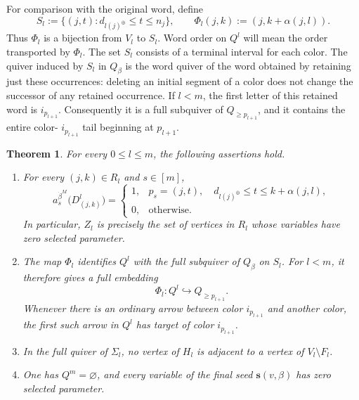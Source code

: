 \documentclass[12pt, reqno]{amsart}
\theoremstyle{plain}
\newtheorem{theorem}{Theorem}[section]
\theoremstyle{definition}
\numberwithin{equation}{section}
\begin{document}
For comparison with the original word, define
\begin{equation}\label{eq:support-image}
 S_l:=\{(j,t):d_{l(j)^\oplus}\leq t\leq n_j\},
 \qquad
 \Phi_l(j,k):=(j,k+\alpha(j,l)).
\end{equation}
Thus \(\Phi_l\) is a bijection from \(V_l\) to \(S_l\). Word order
on \(Q^l\) will mean the order transported by \(\Phi_l\). The set
\(S_l\) consists of a terminal interval for each color. The quiver
induced by \(S_l\) in \(Q_\beta\) is the word quiver of the word
obtained by retaining just these occurrences: deleting an initial
segment of a color does not change the successor of any retained
occurrence. If \(l<m\), the first letter of this retained word is
\(i_{p_{l+1}}\). Consequently it is a full subquiver of
\(Q_{\geq p_{l+1}}\), and it contains the entire color-
\(i_{p_{l+1}}\) tail beginning at \(p_{l+1}\).

\begin{theorem}\label{thm:induction}
For every \(0\leq l\leq m\), the following assertions hold.
\begin{enumerate}
\item For every \((j,k)\in R_l\) and \(s\in[m]\),
\begin{equation}\label{eq:blfacasel}
 a_s^{\dot\beta^M}\bigl(D^l_{(j,k)}\bigr)
 =
 \begin{cases}
 1,&p_s=(j,t),\quad d_{l(j)^\oplus}\leq t\leq k+\alpha(j,l),\\
 0,&\text{otherwise}.
 \end{cases}
\end{equation}
In particular, \(Z_l\) is precisely the set of vertices in \(R_l\)
whose variables have zero selected parameter.
\item The map \(\Phi_l\) identifies \(Q^l\) with the full subquiver
of \(Q_\beta\) on \(S_l\). For \(l<m\), it therefore gives a full
embedding
\[
 \Phi_l:Q^l\hookrightarrow Q_{\geq p_{l+1}}.
\]
Whenever there is an ordinary arrow between color \(i_{p_{l+1}}\)
and another color, the first such arrow in \(Q^l\) has target of
color \(i_{p_{l+1}}\).
\item In the full quiver of \(\Sigma_l\), no vertex of \(H_l\) is
adjacent to a vertex of \(V_l\setminus F_l\).
\item One has \(Q^m=\varnothing\), and every variable of the final
seed \(\mathbf s(v,\beta)\) has zero selected parameter.
\end{enumerate}
\end{theorem}
\end{document}
